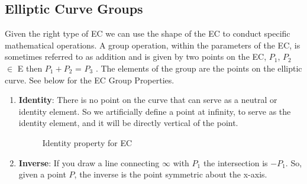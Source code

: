 \subsection{Elliptic Curve Groups}
Given the right type of EC we can use the shape of the EC to conduct specific mathematical operations. A group operation, within the parameters of the EC, is sometimes referred to as addition and is given by two points on the EC, $P_1$, $P_2$ $\in$ E then $P_1 + P_2$ = $P_3$ .  The elements of the group are the points on the elliptic curve.  See below for the EC Group Properties.

\begin{enumerate}[1.]
\item \textbf{Identity}: There is no point on the curve that can serve as a neutral or identity element.  So we artificially define a point at infinity, to serve as the identity element, and it will be directly vertical of the point. 
\begin{figure}[H]
	  \caption{\label{fig:DH:DHKE_13} Identity property for EC}
\end{figure}
\item \textbf{Inverse}: If you draw a line connecting $\infty$ with $P_1$ the intersection is $-P_1$. So, given a point $P$, the inverse is the point symmetric about the x-axis. 
\begin{figure}[H]
\end{figure}
\end{enumerate}
